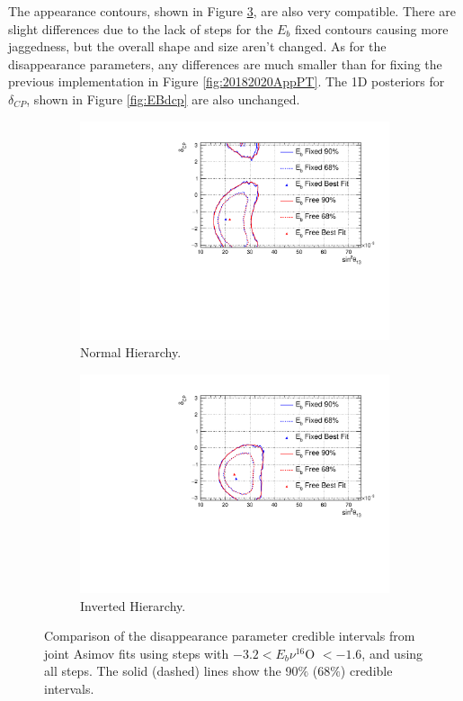 The appearance contours, shown in Figure \ref{fig:EBApp}, are also very compatible. There are slight differences due to the lack of steps for the $E_b$ fixed contours causing more jaggedness, but the overall shape and size aren't changed. As for the disappearance parameters, any differences are much smaller than for fixing the previous implementation in Figure \ref{fig:20182020AppPT}. The 1D posteriors for $\delta_{CP}$, shown in Figure \ref{fig:EBdcp} are also unchanged. 

\begin{figure}[!htbp]
\centering
\begin{subfigure}{.7\textwidth}
  \centering
  \includegraphics[width=0.95\linewidth]{figs/compMaCh3Contours_EB_asimov/compMaCh3Contours_EB_app_asimovA_NH}
  \caption{Normal Hierarchy.}
  \label{fig:EBAppNH}
\end{subfigure}
\begin{subfigure}{.7\textwidth}
  \centering
  \includegraphics[width=0.95\linewidth]{figs/compMaCh3Contours_EB_asimov/compMaCh3Contours_EB_app_asimovA_IH}
  \caption{Inverted Hierarchy.}
  \label{fig:EBAppIH}
\end{subfigure}
\caption{Comparison of the disappearance parameter credible intervals from joint Asimov fits using steps with $ -3.2 < E_b \nu ^{16}$O $< -1.6$, and using all steps. The solid (dashed) lines show the 90$\%$ ($68\%$) credible intervals.}
\label{fig:EBApp}
\end{figure}

